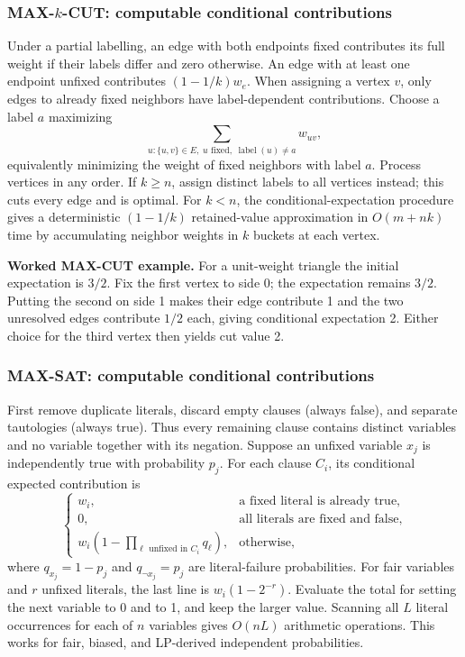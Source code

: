 \subsubsection*{MAX-$k$-CUT: computable conditional contributions}
Under a partial labelling, an edge with both endpoints fixed contributes its
full weight if their labels differ and zero otherwise. An edge with at least
one endpoint unfixed contributes $(1-1/k)w_e$. When assigning a vertex $v$,
only edges to already fixed neighbors have label-dependent contributions.
Choose a label $a$ maximizing
\[
  \sum_{u:\{u,v\}\in E,\;u\text{ fixed},\;\operatorname{label}(u)\ne a}w_{uv},
\]
equivalently minimizing the weight of fixed neighbors with label $a$.
Process vertices in any order. If $k\ge n$, assign distinct labels to all
vertices instead; this cuts every edge and is optimal. For $k<n$, the
conditional-expectation procedure gives a deterministic
$(1-1/k)$ retained-value approximation in $O(m+nk)$ time by accumulating
neighbor weights in $k$ buckets at each vertex.

\textbf{Worked MAX-CUT example.}
For a unit-weight triangle the initial expectation is $3/2$. Fix the first
vertex to side 0; the expectation remains $3/2$. Putting the second on side 1
makes their edge contribute 1 and the two unresolved edges contribute $1/2$
each, giving conditional expectation 2. Either choice for the third vertex
then yields cut value 2.

\subsubsection*{MAX-SAT: computable conditional contributions}
First remove duplicate literals, discard empty clauses (always false), and
separate tautologies (always true). Thus every remaining clause contains
distinct variables and no variable together with its negation. Suppose an
unfixed variable $x_j$ is independently true with probability $p_j$.
For each clause $C_i$, its conditional expected contribution is
\[
  \begin{cases}
    w_i, &\text{a fixed literal is already true},\\
    0, &\text{all literals are fixed and false},\\
    w_i\left(1-\displaystyle\prod_{\ell\text{ unfixed in }C_i}
       q_\ell\right), &\text{otherwise},
  \end{cases}
\]
where $q_{x_j}=1-p_j$ and $q_{\neg x_j}=p_j$ are literal-failure
probabilities. For fair variables and $r$ unfixed literals, the last line is
$w_i(1-2^{-r})$. Evaluate the total for setting the next variable to 0 and
to 1, and keep the larger value. Scanning all $L$ literal occurrences for
each of $n$ variables gives $O(nL)$ arithmetic operations. This works for
fair, biased, and LP-derived independent probabilities.

